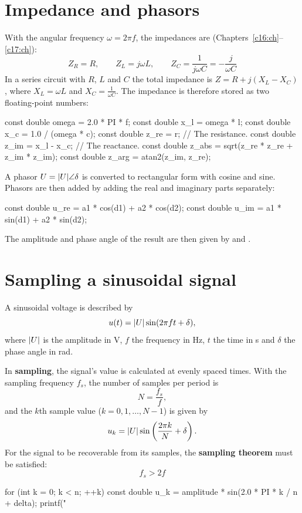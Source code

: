 \section{Impedance and phasors}
\label{c18:sec:impedans}
With the angular frequency $\omega = 2\pi f$, the impedances are (Chapters~\ref{c16:ch}--\ref{c17:ch}):
\[
  Z_R = R, \qquad Z_L = j\omega L, \qquad Z_C = \frac{1}{j\omega C} = -\frac{j}{\omega C}
\]
In a series circuit with $R$, $L$ and $C$ the total impedance is $Z = R + j(X_L - X_C)$, where
$X_L = \omega L$ and $X_C = \frac{1}{\omega C}$. The impedance is therefore stored as two
floating-point numbers:
\begin{ccode}
const double omega = 2.0 * PI * f;
const double x_l   = omega * l;
const double x_c   = 1.0 / (omega * c);
const double z_re  = r;         // The resistance.
const double z_im  = x_l - x_c; // The reactance.
const double z_abs = sqrt(z_re * z_re + z_im * z_im);
const double z_arg = atan2(z_im, z_re);
\end{ccode}
A phasor $U = \lvert U\rvert \angle \delta$ is converted to rectangular form with cosine and sine. Phasors
are then added by adding the real and imaginary parts separately:
\begin{ccode}
const double u_re = a1 * cos(d1) + a2 * cos(d2);
const double u_im = a1 * sin(d1) + a2 * sin(d2);
\end{ccode}
The amplitude and phase angle of the result are then given by  and .

\section{Sampling a sinusoidal signal}
\label{c18:sec:sampling}
A sinusoidal voltage is described by
\[
  u(t) = \lvert U\rvert \sin(2\pi f t + \delta),
\]
where $\lvert U\rvert$ is the amplitude in V, $f$ the frequency in Hz, $t$ the time in s and $\delta$ the
phase angle in rad.

In \textbf{sampling}, the signal's value is calculated at evenly spaced times. With the sampling
frequency $f_s$, the number of samples per period is
\[
  N = \frac{f_s}{f},
\]
and the $k$th sample value ($k = 0, 1, \ldots, N-1$) is given by
\[
  u_k = \lvert U\rvert \sin\left(\frac{2\pi k}{N} + \delta\right).
\]
For the signal to be recoverable from its samples, the \textbf{sampling theorem} must be
satisfied:
\[
  f_s > 2f
\]
\begin{ccode}
for (int k = 0; k < n; ++k)
{
    const double u_k = amplitude * sin(2.0 * PI * k / n + delta);
    printf("%
}
\end{ccode}

